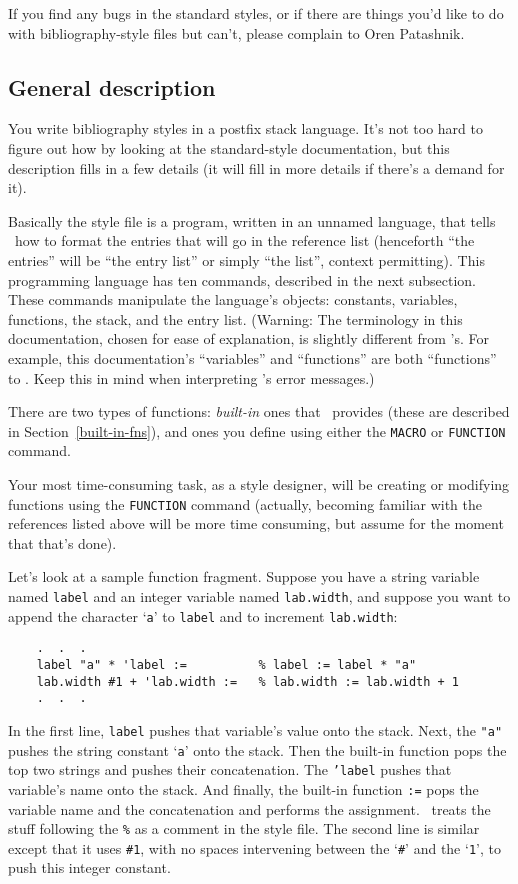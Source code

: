 If you find any bugs in the standard styles,
or if there are things you'd like to do
with bibliography-style files but can't,
please complain to Oren Patashnik.


\subsection{General description}

You write bibliography styles in a postfix stack language.  It's
not too hard to figure out how by looking at the standard-style documentation,
but this description fills in a few details (it will fill in more
details if there's a demand for it).

Basically the style file is a program, written in an unnamed language, that
tells \BibTeX\ how to format the entries that will go in the reference list
(henceforth ``the entries'' will be ``the entry list''
or simply ``the list''$\!$, context permitting).
This programming language has ten commands, described in the next subsection.
These commands manipulate the language's objects:
constants, variables, functions, the stack, and the entry list.
(Warning: The terminology in this documentation,
chosen for ease of explanation, is slightly different from \BibTeX's.
For example, this documentation's ``variables'' and ``functions''
are both ``functions'' to \BibTeX.
Keep this in mind when interpreting \BibTeX's error messages.)

There are two types of functions: {\it built-in\/} ones that \BibTeX\ provides
(these are described in Section~\ref{built-in-fns}), and ones you define
using either the \hbox{\tt MACRO} or \hbox{\tt FUNCTION} command.

Your most time-consuming task, as a style designer,
will be creating or modifying functions
using the \hbox{\tt FUNCTION} command
(actually, becoming familiar with the references listed above will be
more time consuming, but assume for the moment that that's done).

Let's look at a sample function fragment.
Suppose you have a string variable named \hbox{\tt label}
and an integer variable named \hbox{\tt lab.width},
and suppose you want to append the character `{\tt a}' to \hbox{\tt label}
and to increment \hbox{\tt lab.width}:
\begin{verbatim}
    .  .  .
    label "a" * 'label :=          % label := label * "a"
    lab.width #1 + 'lab.width :=   % lab.width := lab.width + 1
    .  .  .
\end{verbatim}
In the first line,
\hbox{\tt label} pushes that variable's value onto the stack.
Next, the {\tt "a"} pushes the string constant `{\tt a}' onto the stack.
Then the built-in function {\tt *} pops the top two strings and
pushes their concatenation.
The \hbox{\tt 'label} pushes that variable's name onto the stack.
And finally, the built-in function {\tt :=} pops
the variable name and the concatenation and performs the assignment.
\BibTeX\ treats the stuff following the {\tt \%} as a comment
in the style file.
The second line is similar except that it uses {\tt \#1},
with no spaces intervening between the `{\tt \#}' and the `{\tt 1}'$\!$,
to push this integer constant.

